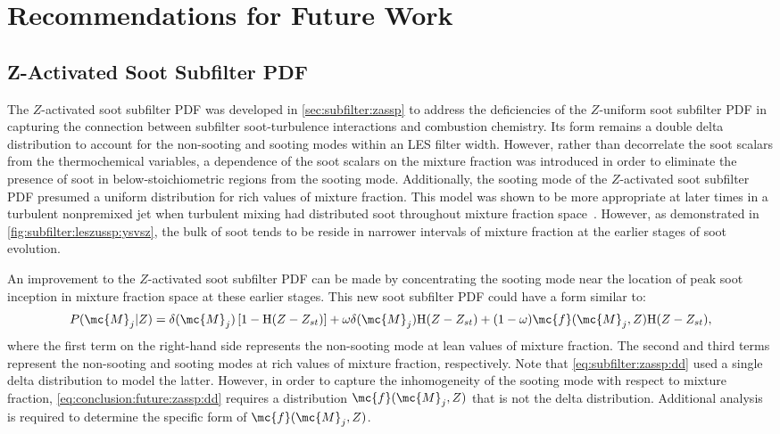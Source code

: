 \section{Recommendations for Future Work}
\label{sec:conclusion:future}

\subsection{Z-Activated Soot Subfilter PDF}
\label{sec:conclusion:future:zassp}

The $Z$-activated soot subfilter PDF was developed in \cref{sec:subfilter:zassp} to address the deficiencies of the $Z$-uniform soot subfilter PDF in capturing the connection between subfilter soot-turbulence interactions and combustion chemistry. Its form remains a double delta distribution to account for the non-sooting and sooting modes within an LES filter width. However, rather than decorrelate the soot scalars from the thermochemical variables, a dependence of the soot scalars on the mixture fraction was introduced in order to eliminate the presence of soot in below-stoichiometric regions from the sooting mode. Additionally, the sooting mode of the $Z$-activated soot subfilter PDF presumed a uniform distribution for rich values of mixture fraction. This model was shown to be more appropriate at later times in a turbulent nonpremixed jet when turbulent mixing had distributed soot throughout mixture fraction space~\cite{attili2014}. However, as demonstrated in \cref{fig:subfilter:leszussp:ysvsz}, the bulk of soot tends to be reside in narrower intervals of mixture fraction at the earlier stages of soot evolution.

An improvement to the $Z$-activated soot subfilter PDF can be made by concentrating the sooting mode near the location of peak soot inception in mixture fraction space at these earlier stages. This new soot subfilter PDF could have a form similar to:
\begin{equation}\label{eq:conclusion:future:zassp:dd}
  P(\mc{M}_j|Z) = \delta(\mc{M}_j)\left[ 1 - \text{H}(Z - Z_{st}) \right] + \omega\delta(\mc{M}_j)\text{H}(Z - Z_{st}) + (1 - \omega)\mc{f}(\mc{M}_j, Z)\text{H}(Z - Z_{st}),
\end{equation}
where the first term on the right-hand side represents the non-sooting mode at lean values of mixture fraction. The second and third terms represent the non-sooting and sooting modes at rich values of mixture fraction, respectively. Note that \cref{eq:subfilter:zassp:dd} used a single delta distribution to model the latter. However, in order to capture the inhomogeneity of the sooting mode with respect to mixture fraction, \cref{eq:conclusion:future:zassp:dd} requires a distribution $\mc{f}(\mc{M}_j, Z)$ that is not the delta distribution. Additional analysis is required to determine the specific form of $\mc{f}(\mc{M}_j, Z)$.

